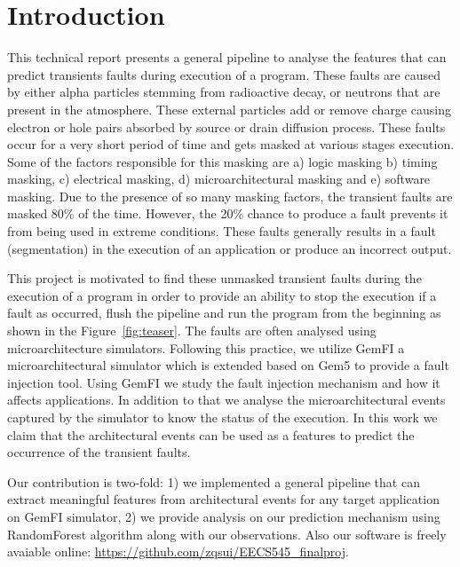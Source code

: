 \section{Introduction}
This technical report presents a general pipeline to analyse the features that can predict transients faults during execution of a program. These faults are caused by either alpha particles stemming from radioactive decay, or neutrons that are present in the atmosphere. These external particles add or remove charge causing electron or hole pairs absorbed by source or drain diffusion process. These faults occur for a very short period of time and gets masked at various stages execution. Some of the factors responsible for this masking are a) logic masking b) timing masking, c) electrical masking, d) microarchitectural masking and e) software masking. Due to the presence of so many masking factors, the transient faults are masked 80\% of the time. However, the 20\% chance to produce a fault prevents it from being used in extreme conditions. These faults generally results in a fault (segmentation) in the execution of an application or produce an incorrect output.

This project is motivated to find these unmasked transient faults during the execution of a program in order to provide an ability to stop the execution if a fault as occurred, flush the pipeline and run the program from the beginning as shown in the Figure~\ref{fig:teaser}. The faults are often analysed using microarchitecture simulators. Following this practice, we utilize GemFI \cite{parasyris2014gemfi} a microarchitectural simulator which is extended based on Gem5 \cite{Binkert:2011:GS:2024716.2024718} to provide a fault injection tool. Using GemFI we study the fault injection mechanism and how it affects applications. In addition to that we analyse the microarchitectural events captured by the simulator to know the status of the execution. In this work we claim that the architectural events can be used as a features to predict the occurrence of the transient faults.

Our contribution is two-fold: 1) we implemented a general pipeline that can extract meaningful features from architectural events for any target application on GemFI simulator, 2) we provide analysis on our prediction mechanism using RandomForest \cite{breiman2001random} algorithm along with our observations. Also our software is freely avaiable online: \url{https://github.com/zqsui/EECS545_finalproj}.

